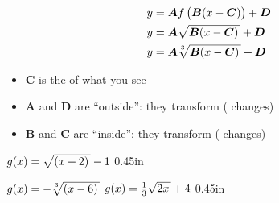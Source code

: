 \begin{tcolorbox}[center,colback=white,width=6in,]
    \centering
    {
    \large
    \vspace{-1\baselineskip}
    \begin{align*}
    y &= \bm{A} f\left( \text{\rule{0pt}{0.9em}}\bm{B}(x-\bm{C})\right) + \bm{D} \\ 
    y &= \bm{A} \myRoot{ \bm{B}(x-\bm{C})} + \bm{D}\\ 
    y &= \bm{A} \myRoot[3]{ \bm{B}(x-\bm{C})} + \bm{D}
    \end{align*}
    }
    \tcblower 
    \begin{itemize}[fullwidth]
        \item {$\bm{C}$ is the  of what you see}
        \item $\bm{A}$ and $\bm{D}$ are ``outside'': they transform  ( changes)
        \item $\bm{B}$ and $\bm{C}$ are ``inside'': they transform  ( changes)
    \end{itemize}
\end{tcolorbox}

{
    $g(x) =  \myRoot{(x+2)} - 1$
}
{0.45in}

\myProblems
{
    $g(x) =  -\myRoot[3]{(x-6)} $
}
{
    $g(x) =  \frac{1}{3}\myRoot{2x} + 4 $
}
{0.45in}
